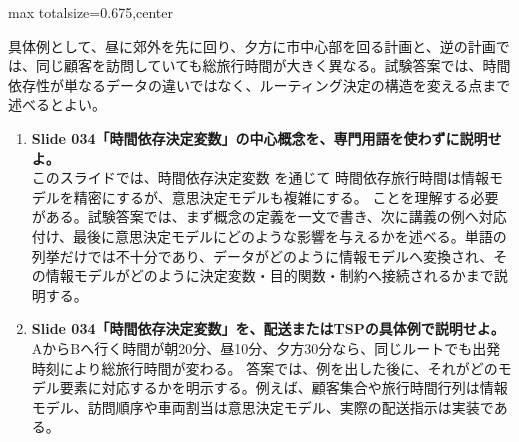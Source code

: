 \begin{adjustbox}{max totalsize={\textwidth}{0.675\textheight},center}
\begin{minipage}{\textwidth}
\begin{minipage}[t]{0.485\textwidth}
具体例として、昼に郊外を先に回り、夕方に市中心部を回る計画と、逆の計画では、同じ顧客を訪問していても総旅行時間が大きく異なる。試験答案では、時間依存性が単なるデータの違いではなく、ルーティング決定の構造を変える点まで述べるとよい。\par
{}
\begin{enumerate}
\item \textbf{Slide 034「時間依存決定変数」の中心概念を、専門用語を使わずに説明せよ。}\\このスライドでは、時間依存決定変数 を通じて 時間依存旅行時間は情報モデルを精密にするが、意思決定モデルも複雑にする。 ことを理解する必要がある。試験答案では、まず概念の定義を一文で書き、次に講義の例へ対応付け、最後に意思決定モデルにどのような影響を与えるかを述べる。単語の列挙だけでは不十分であり、データがどのように情報モデルへ変換され、その情報モデルがどのように決定変数・目的関数・制約へ接続されるかまで説明する。
\item \textbf{Slide 034「時間依存決定変数」を、配送またはTSPの具体例で説明せよ。}\\AからBへ行く時間が朝20分、昼10分、夕方30分なら、同じルートでも出発時刻により総旅行時間が変わる。 答案では、例を出した後に、それがどのモデル要素に対応するかを明示する。例えば、顧客集合や旅行時間行列は情報モデル、訪問順序や車両割当は意思決定モデル、実際の配送指示は実装である。
\end{enumerate}
\end{minipage}
\end{minipage}
\end{adjustbox}

